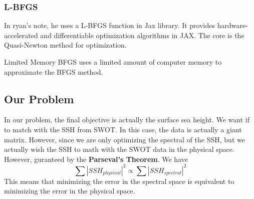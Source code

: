 \documentclass[../SQG_notes.tex]{subfiles}
\begin{document}
\subsubsection{L-BFGS}
In ryan's note, he uses a L-BFGS function in Jax library. It provides hardware-accelerated and differentiable optimization algorithms in JAX. The core is the Quasi-Newton method for optimization.\par
Limited Memory BFGS uses a limited amount of computer memory to approximate the BFGS method. 

\subsection{Our Problem}
In our problem, the final objective is actually the surface sea height. We want if to match with the SSH from SWOT. In this case, the data is actually a giant matrix. However, since we are only optimizing the spectral of the SSH, but we actually wish the SSH to math with the SWOT data in the physical space. However, guranteed by the \textbf{Parseval's Theorem}. We have 
\[\sum |SSH_{physical}|^2 \propto \sum |SSH_{spectral}|^2\]
This means that minimizing the error in the spectral space is equivalent to minimizing the error in the physical space. 
\end{document}
